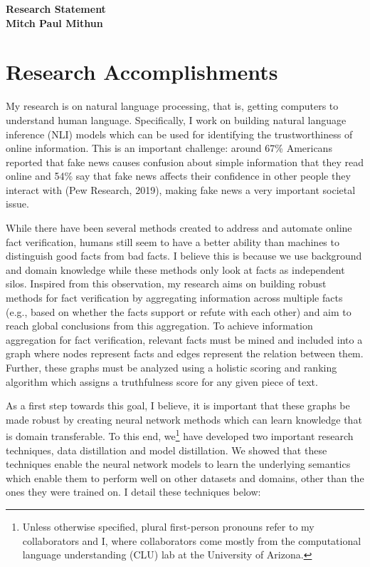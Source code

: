 \documentclass[10pt]{article}
\begin{document}

\begin{center}
{\Large \bf Research Statement\\
\smallskip
{\large \bf Mitch Paul Mithun}}
\end{center}


\section{Research Accomplishments}

My research is on natural language processing, that is, getting computers to understand human language. Specifically, I work on  building natural language inference (NLI) models which can be used for identifying the trustworthiness of online information. This is an important challenge: around 67\% Americans reported that fake news causes confusion about simple information that they read online and 54\% say that fake news affects their confidence in other people they interact with (Pew Research, 2019), making fake news a very important societal issue.

While there have been several methods created to address and automate online fact verification, humans still seem to have a better ability than machines to distinguish good facts from bad facts. I believe this is because we use background and domain knowledge while these methods only look at facts as independent silos. Inspired from this observation, my research aims on building robust methods for fact verification by aggregating information across multiple facts (e.g., based on whether the facts support or refute with each other) and aim to reach global conclusions from this aggregation. 
To achieve information aggregation for fact verification, relevant facts must be mined and included into a graph where nodes represent facts and edges represent the relation between them. 
Further, these graphs must be analyzed using a holistic scoring and ranking algorithm which assigns a truthfulness score for any given piece of text.

As a first step towards this goal, I believe, it is important that these graphs be made robust by creating neural network methods which can learn knowledge that is domain transferable. To this end, we\footnote{Unless otherwise specified, plural first-person pronouns refer to my collaborators and I, where collaborators come mostly from the computational language understanding (CLU) lab at the University of Arizona.}  have developed two important research techniques, data distillation and model distillation. We showed that these techniques enable the neural network models to learn the underlying semantics which enable them to perform well on other datasets and domains, other than the ones they were trained on.
I detail these techniques below:
\end{document}
